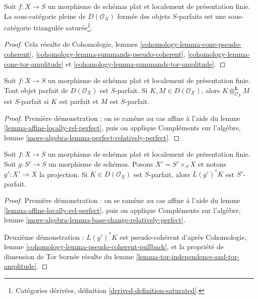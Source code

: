 \begin{lemma}
\label{lemma-triangulated}
Soit $f : X \to S$ un morphisme de schémas
plat et localement de présentation finie. La sous-catégorie pleine
de $D(\mathcal{O}_X)$ formée des objets $S$-parfaits est
une sous-catégorie triangulée saturée\footnote{Catégories dérivées, définition
\ref{derived-definition-saturated}.}.
\end{lemma}

\begin{proof}
Cela résulte de Cohomologie, lemmes
\ref{cohomology-lemma-cone-pseudo-coherent},
\ref{cohomology-lemma-summands-pseudo-coherent},
\ref{cohomology-lemma-cone-tor-amplitude} et
\ref{cohomology-lemma-summands-tor-amplitude}.
\end{proof}

\begin{lemma}
\label{lemma-perfect-relatively-perfect}
Soit $f : X \to S$ un morphisme de schémas plat et localement
de présentation finie. Tout objet parfait de $D(\mathcal{O}_X)$ est $S$-parfait.
Si $K, M \in D(\mathcal{O}_X)$, alors $K \otimes_{\mathcal{O}_X}^\mathbf{L} M$
est $S$-parfait si $K$ est parfait et $M$ est $S$-parfait.
\end{lemma}

\begin{proof}
Première démonstration : on se ramène au cas affine à l'aide du
lemme \ref{lemma-affine-locally-rel-perfect},
puis on applique Compléments sur l'algèbre, lemme
\ref{more-algebra-lemma-perfect-relatively-perfect}.
\end{proof}

\begin{lemma}
\label{lemma-base-change-relatively-perfect}
Soit $f : X \to S$ un morphisme de schémas plat et
localement de présentation finie.
Soit $g : S' \to S$ un morphisme de schémas. Posons $X' = S' \times_S X$
et notons $g' : X' \to X$ la projection.
Si $K \in D(\mathcal{O}_X)$ est $S$-parfait, alors $L(g')^*K$
est $S'$-parfait.
\end{lemma}

\begin{proof}
Première démonstration : on se ramène au cas affine à l'aide du
lemme \ref{lemma-affine-locally-rel-perfect},
puis on applique Compléments sur l'algèbre, lemme
\ref{more-algebra-lemma-base-change-relatively-perfect}.

\medskip\noindent
Deuxième démonstration : $L(g')^*K$ est pseudo-cohérent d'après
Cohomologie, lemme \ref{cohomology-lemma-pseudo-coherent-pullback},
et la propriété de dimension de Tor bornée résulte du
lemme \ref{lemma-tor-independence-and-tor-amplitude}.
\end{proof}

